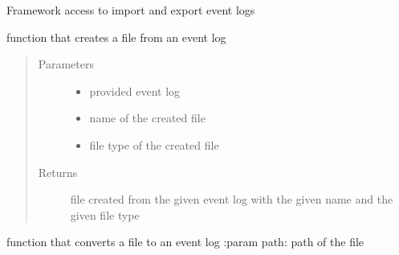 \documentclass[letterpaper,10pt,english]{sphinxmanual}
\begin{document}
\begin{fulllineitems}
\label{\detokenize{eventLogConverter:eventLogConverter.fileUtility.FileUtilityBase}}
Framework access to import and export event logs

\begin{fulllineitems}
\label{\detokenize{eventLogConverter:eventLogConverter.fileUtility.FileUtilityBase.createFile}}
function that creates a file from an event log
\begin{quote}\begin{description}
\item[{Parameters}] \leavevmode\begin{itemize}
\item {} 
 \textendash{} provided event log

\item {} 
 \textendash{} name of the created file

\item {} 
 \textendash{} file type of the created file

\end{itemize}

\item[{Returns}] \leavevmode
file created from the given event log with the given name and the given file type

\end{description}\end{quote}

\end{fulllineitems}


\begin{fulllineitems}
\label{\detokenize{eventLogConverter:eventLogConverter.fileUtility.FileUtilityBase.getEventLogFromFile}}
function that converts a file to an event log
:param path: path of the file


\end{fulllineitems}
\end{fulllineitems}
\end{document}
